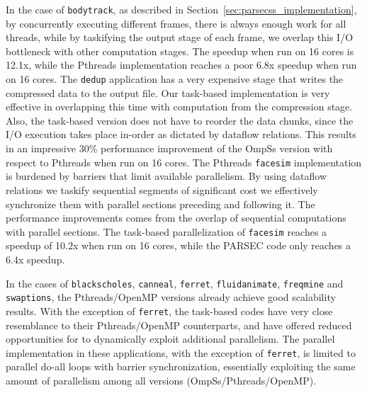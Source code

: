 In the case of \texttt{bodytrack}, as described in Section~\ref{sec:parsecss_implementation}, by concurrently executing different frames, there is always enough work for all threads, while by taskifying the 
output stage of each frame, we overlap this I/O bottleneck with other computation stages. The speedup when run on 16 cores is 12.1x, while the Pthreads implementation reaches a poor 6.8x speedup when run on 16 cores.
The \texttt{dedup} application has a very expensive stage that writes the compressed data to the output file. 
Our task-based implementation is very effective in overlapping this time with computation from the compression stage. Also, the task-based version does not have to reorder the data chunks, 
since the I/O execution takes place in-order as dictated by dataflow relations. This results in an impressive 30\% performance improvement of the OmpSs version with respect to Pthreads when run on 16 cores.
The Pthreads \texttt{facesim} implementation is burdened by barriers that limit available parallelism. 
By using dataflow relations 
we taskify sequential segments of significant cost we effectively
synchronize them with parallel sections preceding and following it.
The performance improvements comes from the overlap of sequential computations with parallel sections.
The task-based parallelization of \texttt{facesim} reaches a speedup of 10.2x when run on 16 cores, while the PARSEC code only reaches a 6.4x speedup.

In the cases of \texttt{blackscholes}, \texttt{canneal}, \texttt{ferret}, \texttt{fluidanimate}, \texttt{freqmine} and \texttt{swaptions}, the Pthreads/OpenMP
versions already achieve good scalability results. With the exception of \texttt{ferret}, the task-based codes have very close resemblance to their Pthreads/OpenMP counterparts, and have offered reduced 
opportunities for \OMPSS{} to dynamically exploit additional parallelism.  
The parallel implementation in these applications, with the exception of \texttt{ferret}, is limited to parallel do-all loops with 
barrier synchronization, essentially exploiting the same amount of parallelism among all versions (OmpSs/Pthreads/OpenMP). 

